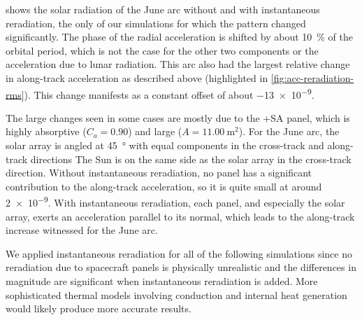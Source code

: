  shows the solar radiation of the June arc without and with instantaneous reradiation, the only of our simulations for which the pattern changed significantly. The phase of the radial acceleration is shifted by about \qty{10}{\percent} of the orbital period, which is not the case for the other two components or the acceleration due to lunar radiation. This arc also had the largest relative change in along-track acceleration as described above (highlighted in \cref{fig:acc-reradiation-rms}). This change manifests as a constant offset of about \qty{-13e-9}{\acc}. 

The large changes seen in some cases are mostly due to the +SA panel, which is highly absorptive ($C_a = 0.90$) and large ($A = \qty{11.00}{\m\squared}$). For the June arc, the solar array is angled at \qty{45}{\degree} with equal components in the cross-track and along-track directions The Sun is on the same side as the solar array in the cross-track direction. Without instantaneous reradiation, no panel has a significant contribution to the along-track acceleration, so it is quite small at around \qty{2e-9}{\acc}. With instantaneous reradiation, each panel, and especially the solar array, exerts an acceleration parallel to its normal, which leads to the along-track increase witnessed for the June arc.

We applied instantaneous reradiation for all of the following simulations since no reradiation due to spacecraft panels is physically unrealistic and the differences in magnitude are significant when instantaneous reradiation is added. More sophisticated thermal models involving conduction and internal heat generation would likely produce more accurate results.












